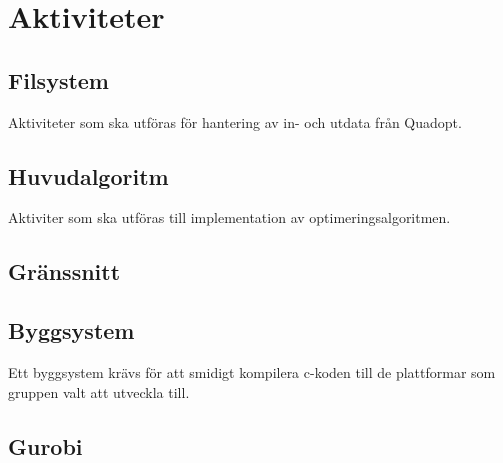 \section{Aktiviteter}

\subsection{Filsystem}
Aktiviteter som ska utföras för hantering av in- och utdata från Quadopt.
\begin{LIPSaktivitetslista}
\end{LIPSaktivitetslista}

\subsection{Huvudalgoritm}
Aktiviter som ska utföras till implementation av optimeringsalgoritmen.
\begin{LIPSaktivitetslista}
\end{LIPSaktivitetslista}

\subsection{Gränssnitt}

\begin{LIPSaktivitetslista}
\end{LIPSaktivitetslista}

\subsection{Byggsystem}
Ett byggsystem krävs för att smidigt kompilera c-koden till de plattformar som gruppen valt att utveckla till.
\begin{LIPSaktivitetslista}
\end{LIPSaktivitetslista}

\subsection{Gurobi}
\begin{LIPSaktivitetslista}
\end{LIPSaktivitetslista}
